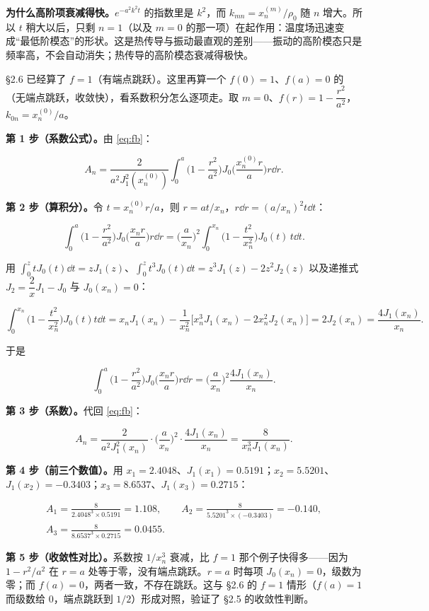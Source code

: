 \documentclass[11pt]{ctexart}
\let\origsubhdr\subhdr
\renewcommand{\subhdr}[1]{\par\needspace{3\baselineskip}\origsubhdr{#1}}
\begin{document}
\textbf{为什么高阶项衰减得快。}$e^{-a^2k^2t}$ 的指数里是 $k^2$，而 $k_{mn}=x_n^{(m)}/\rho_0$ 随 $n$ 增大。所以 $t$ 稍大以后，只剩 $n=1$（以及 $m=0$ 的那一项）在起作用：温度场迅速变成“最低阶模态”的形状。这是热传导与振动最直观的差别——振动的高阶模态只是频率高，不会自动消失；热传导的高阶模态衰减得极快。


\S2.6 已经算了 $f=1$（有端点跳跃）。这里再算一个 $f(0)=1$、$f(a)=0$ 的（无端点跳跃，收敛快），看系数积分怎么逐项走。取 $m=0$、$f(r)=1-\dfrac{r^2}{a^2}$，$k_{0n}=x_n^{(0)}/a$。

\textbf{第 1 步（系数公式）。}由 \eqref{eq:fb}：

\[
A_n=\frac{2}{a^2J_1^2(x_n^{(0)})}\int_0^a\Big(1-\frac{r^2}{a^2}\Big)J_0\Big(\frac{x_n^{(0)}r}{a}\Big)r\dd r .
\]

\textbf{第 2 步（算积分）。}令 $t=x_n^{(0)}r/a$，则 $r=at/x_n$，$r\dd r=(a/x_n)^2t\dd t$：

\[
\int_0^a\Big(1-\frac{r^2}{a^2}\Big)J_0\Big(\frac{x_nr}{a}\Big)r\dd r
=\Big(\frac{a}{x_n}\Big)^2\int_0^{x_n}\Big(1-\frac{t^2}{x_n^2}\Big)J_0(t)\,t\dd t .
\]

用 $\int_0^ztJ_0(t)\dd t=zJ_1(z)$、$\int_0^zt^3J_0(t)\dd t=z^3J_1(z)-2z^2J_2(z)$ 以及递推式 $J_2=\dfrac2xJ_1-J_0$ 与 $J_0(x_n)=0$：

\[
\int_0^{x_n}\Big(1-\frac{t^2}{x_n^2}\Big)J_0(t)t\dd t
=x_nJ_1(x_n)-\frac1{x_n^2}\Big[x_n^3J_1(x_n)-2x_n^2J_2(x_n)\Big]
=2J_2(x_n)
=\frac{4J_1(x_n)}{x_n}.
\]

于是

\[
\int_0^a\Big(1-\frac{r^2}{a^2}\Big)J_0\Big(\frac{x_nr}{a}\Big)r\dd r
=\Big(\frac{a}{x_n}\Big)^2\frac{4J_1(x_n)}{x_n} .
\]

\textbf{第 3 步（系数）。}代回 \eqref{eq:fb}：

\[
A_n=\frac{2}{a^2J_1^2(x_n)}\cdot\Big(\frac{a}{x_n}\Big)^2\cdot\frac{4J_1(x_n)}{x_n}
=\frac{8}{x_n^3J_1(x_n)} .
\]

\textbf{第 4 步（前三个数值）。}用 $x_1=2.4048$、$J_1(x_1)=0.5191$；$x_2=5.5201$、$J_1(x_2)=-0.3403$；$x_3=8.6537$、$J_1(x_3)=0.2715$：

\begin{gather*}
A_1=\frac{8}{2.4048^3\times0.5191}=1.108,\qquad
A_2=\frac{8}{5.5201^3\times(-0.3403)}=-0.140,\\
A_3=\frac{8}{8.6537^3\times0.2715}=0.0455 .
\end{gather*}

\textbf{第 5 步（收敛性对比）。}系数按 $1/x_n^3$ 衰减，比 $f=1$ 那个例子快得多——因为 $1-r^2/a^2$ 在 $r=a$ 处等于零，没有端点跳跃。$r=a$ 时每项 $J_0(x_n)=0$，级数为零；而 $f(a)=0$，两者一致，不存在跳跃。这与 \S2.6 的 $f=1$ 情形（$f(a)=1$ 而级数给 $0$，端点跳跃到 $1/2$）形成对照，验证了 \S2.5 的收敛性判断。
\end{document}
